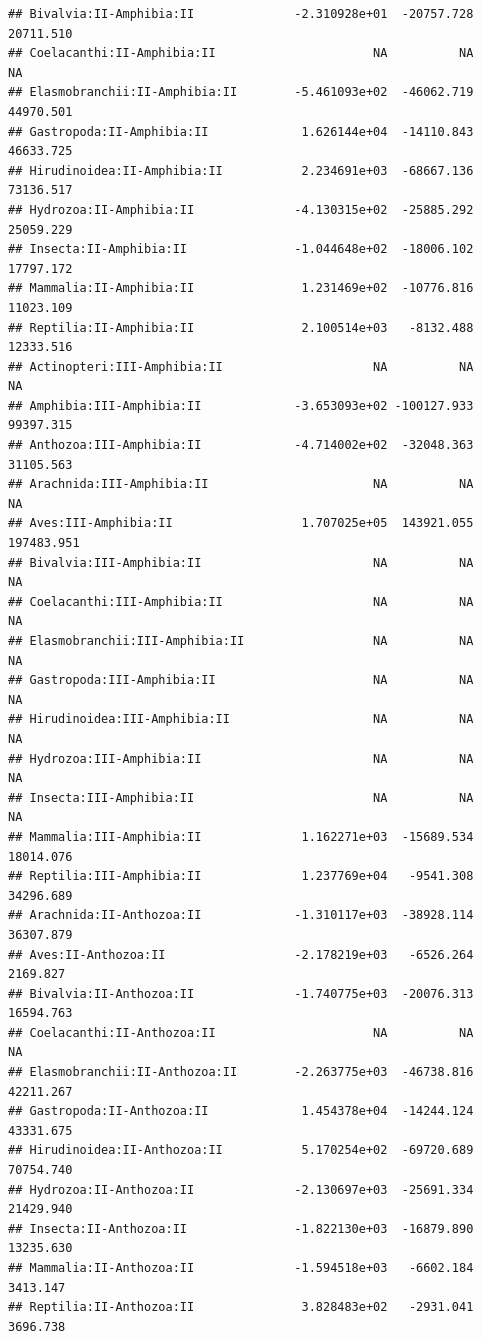 \documentclass[
  12pt,
]{article}
\begin{document}
\begin{verbatim}
## Bivalvia:II-Amphibia:II              -2.310928e+01  -20757.728   20711.510
## Coelacanthi:II-Amphibia:II                      NA          NA          NA
## Elasmobranchii:II-Amphibia:II        -5.461093e+02  -46062.719   44970.501
## Gastropoda:II-Amphibia:II             1.626144e+04  -14110.843   46633.725
## Hirudinoidea:II-Amphibia:II           2.234691e+03  -68667.136   73136.517
## Hydrozoa:II-Amphibia:II              -4.130315e+02  -25885.292   25059.229
## Insecta:II-Amphibia:II               -1.044648e+02  -18006.102   17797.172
## Mammalia:II-Amphibia:II               1.231469e+02  -10776.816   11023.109
## Reptilia:II-Amphibia:II               2.100514e+03   -8132.488   12333.516
## Actinopteri:III-Amphibia:II                     NA          NA          NA
## Amphibia:III-Amphibia:II             -3.653093e+02 -100127.933   99397.315
## Anthozoa:III-Amphibia:II             -4.714002e+02  -32048.363   31105.563
## Arachnida:III-Amphibia:II                       NA          NA          NA
## Aves:III-Amphibia:II                  1.707025e+05  143921.055  197483.951
## Bivalvia:III-Amphibia:II                        NA          NA          NA
## Coelacanthi:III-Amphibia:II                     NA          NA          NA
## Elasmobranchii:III-Amphibia:II                  NA          NA          NA
## Gastropoda:III-Amphibia:II                      NA          NA          NA
## Hirudinoidea:III-Amphibia:II                    NA          NA          NA
## Hydrozoa:III-Amphibia:II                        NA          NA          NA
## Insecta:III-Amphibia:II                         NA          NA          NA
## Mammalia:III-Amphibia:II              1.162271e+03  -15689.534   18014.076
## Reptilia:III-Amphibia:II              1.237769e+04   -9541.308   34296.689
## Arachnida:II-Anthozoa:II             -1.310117e+03  -38928.114   36307.879
## Aves:II-Anthozoa:II                  -2.178219e+03   -6526.264    2169.827
## Bivalvia:II-Anthozoa:II              -1.740775e+03  -20076.313   16594.763
## Coelacanthi:II-Anthozoa:II                      NA          NA          NA
## Elasmobranchii:II-Anthozoa:II        -2.263775e+03  -46738.816   42211.267
## Gastropoda:II-Anthozoa:II             1.454378e+04  -14244.124   43331.675
## Hirudinoidea:II-Anthozoa:II           5.170254e+02  -69720.689   70754.740
## Hydrozoa:II-Anthozoa:II              -2.130697e+03  -25691.334   21429.940
## Insecta:II-Anthozoa:II               -1.822130e+03  -16879.890   13235.630
## Mammalia:II-Anthozoa:II              -1.594518e+03   -6602.184    3413.147
## Reptilia:II-Anthozoa:II               3.828483e+02   -2931.041    3696.738

\end{verbatim}
\end{document}
